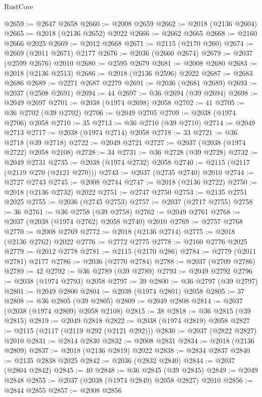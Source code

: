 \begin{lexlean}{RustCore}
\begin{coremodule}
@2659 := @2647 @2658
@2660 := @2008 @2659
@2662 := @2018 (@2136 @2604)
@2665 := @2018 (@2136 @2652) @2022
@2666 := @2662 @2665
@2668 := @2160 @2666 @2025
@2669 := @2012 @2668
@2671 := @2115 (@2170 @260)
@2674 := @2669 (@2011 @2671) @2177
@2676 := @2036 (@2660 @2674)
@2679 := @2037 (@2599 @2676) @2010
@2680 := @2595 @2679
@2681 := @2008 @2680
@2683 := @2018 (@2136 @2513)
@2686 := @2018 (@2136 @2596) @2022
@2687 := @2683 @2686
@2689 := @2271 @2687 @2279
@2691 := @2036 (@2681 @2689)
@2693 := @2037 (@2508 @2691)
@2694 := 44
@2697 := @36 @2694 (@39 @2694)
@2698 := @2049 @2697
@2701 := @2038 (@1974 @2698) @2058
@2702 := 41
@2705 := @36 @2702 (@39 @2702)
@2706 := @2049 @2705
@2709 := @2038 (@1974 @2706) @2058
@2710 := 35
@2713 := @36 @2710 (@39 @2710)
@2714 := @2049 @2713
@2717 := @2038 (@1974 @2714) @2058
@2718 := 33
@2721 := @36 @2718 (@39 @2718)
@2722 := @2049 @2721
@2727 := @2037 (@2038 (@1974 @2722) @2058 @2108)
@2728 := 34
@2731 := @36 @2728 (@39 @2728)
@2732 := @2049 @2731
@2735 := @2038 (@1974 @2732) @2058
@2740 := @2115 (@2117 (@2119 @270 (@2121 @270)))
@2743 := @2037 (@2735 @2740) @2010
@2744 := @2727 @2743
@2745 := @2008 @2744
@2747 := @2018 (@2136 @2722)
@2750 := @2018 (@2136 @2732) @2022
@2751 := @2747 @2750
@2753 := @2135 @2751 @2025
@2755 := @2036 (@2745 @2753)
@2757 := @2037 (@2717 @2755)
@2758 := 36
@2761 := @36 @2758 (@39 @2758)
@2762 := @2049 @2761
@2768 := @2037 (@2038 (@1974 @2762) @2058 @2740) @2010
@2769 := @2757 @2768
@2770 := @2008 @2769
@2772 := @2018 (@2136 @2714)
@2775 := @2018 (@2136 @2762) @2022
@2776 := @2772 @2775
@2778 := @2160 @2776 @2025
@2779 := @2012 @2778
@2781 := @2115 (@2170 @286)
@2784 := @2779 (@2011 @2781) @2177
@2786 := @2036 (@2770 @2784)
@2788 := @2037 (@2709 @2786)
@2789 := 42
@2792 := @36 @2789 (@39 @2789)
@2793 := @2049 @2792
@2796 := @2038 (@1974 @2793) @2058
@2797 := 39
@2800 := @36 @2797 (@39 @2797)
@2801 := @2049 @2800
@2804 := @2038 (@1974 @2801) @2058
@2805 := 37
@2808 := @36 @2805 (@39 @2805)
@2809 := @2049 @2808
@2814 := @2037 (@2038 (@1974 @2809) @2058 @2108)
@2815 := 38
@2818 := @36 @2815 (@39 @2815)
@2819 := @2049 @2818
@2822 := @2038 (@1974 @2819) @2058
@2827 := @2115 (@2117 (@2119 @292 (@2121 @292)))
@2830 := @2037 (@2822 @2827) @2010
@2831 := @2814 @2830
@2832 := @2008 @2831
@2834 := @2018 (@2136 @2809)
@2837 := @2018 (@2136 @2819) @2022
@2838 := @2834 @2837
@2840 := @2135 @2838 @2025
@2842 := @2036 (@2832 @2840)
@2844 := @2037 (@2804 @2842)
@2845 := 40
@2848 := @36 @2845 (@39 @2845)
@2849 := @2049 @2848
@2855 := @2037 (@2038 (@1974 @2849) @2058 @2827) @2010
@2856 := @2844 @2855
@2857 := @2008 @2856

\end{coremodule}
\end{lexlean}
